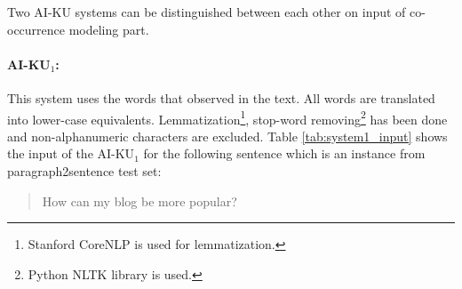 \documentclass[11pt]{article}
\begin{document}
\begin{table}[t]
\begin{center}


\end{center}
\caption{\label{table:results-s2p} Sentence2phrase subtask scores for the test set. \emph{Best} indicates the best score for the subtasks. LCS stands for Normalized Longest Common Substring. Subscripts in AI-KU systems indicate the run number.}
\end{table}

Two AI-KU systems can be distinguished between each other on input of co-occurrence modeling part. 

\paragraph{AI-KU$_1$:} This system uses the words that observed in the text. All words are translated into lower-case equivalents. Lemmatization\footnote{Stanford CoreNLP is used for lemmatization.}, stop-word removing\footnote{Python NLTK library is used.} has been done and non-alphanumeric characters are excluded. Table \ref{tab:system1_input} shows the input of the AI-KU$_1$ for the following sentence which is an instance from paragraph2sentence test set:

\begin{quote}
How can my blog be more popular?
\end{quote}
\end{document}
